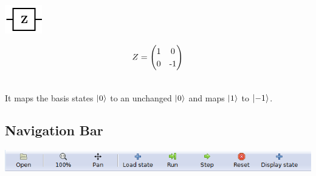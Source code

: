 \documentclass[10pt]{article}
\theoremstyle{definition}
\newcommand{\microspace}{\mspace{0.5mu}}
\def \lket {\left|}
\def \rket {\right\rangle}
\newcommand{\ket}[1]{\lket\microspace #1 \microspace\rket}
\begin{document}
\begin{itemize}
\begin{center}
\includegraphics[scale=.7]{Figures/Gates/ZGateViewer} \\
  \begin{minipage}{.9\linewidth}
    \begin{equation*} \label{mat:ZGate}
    \renewcommand{\arraystretch}{1.25}
Z = \begin{pmatrix} 1 & 0 \\ 0 & \textnormal{-}1 \end{pmatrix}
    \end{equation*}
  \end{minipage}\hspace{-2.5cm}
  \begin{minipage}{.2\linewidth}
  \vspace*{3pt}
    \begin{align}
    \end{align}
  \end{minipage}
\end{center}

It maps the basis states $\ket{0}$ to an unchanged $\ket{0}$ and maps $\ket{1}$ to $\ket{-1}$. 

\end{itemize}

\subsection{Navigation Bar}\label{sub:NavigationBar}

\begin{center}
\includegraphics{Figures/Navigation/NavigationBar.png}
\end{center}
\end{document}
